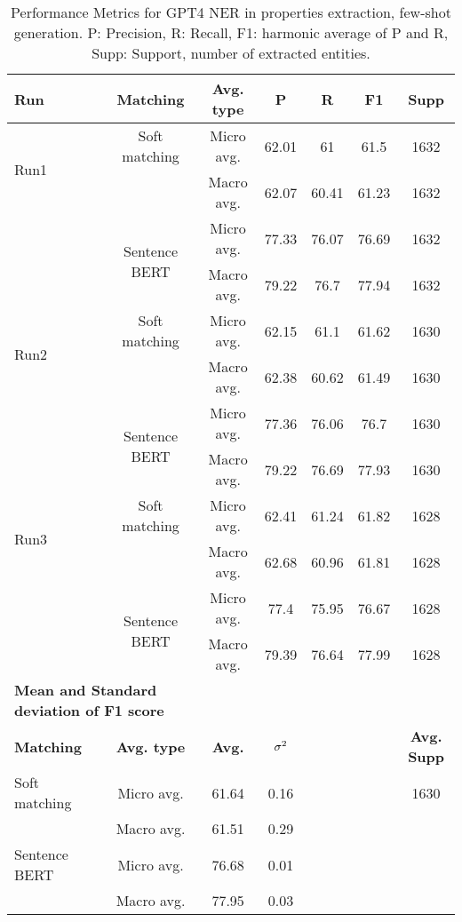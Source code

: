 \begin{table}[htbp]
\small
  \centering
  \caption{Performance Metrics for GPT4 NER in properties extraction, few-shot generation. P: Precision, R: Recall, F1: harmonic average of P and R, Supp: Support, number of extracted entities.}
  \begin{tabular}{lcccccc}
    \toprule
   \textbf{Run} & \textbf{Matching} & \textbf{Avg. type} & \textbf{P} & \textbf{R} & \textbf{F1} & \textbf{Supp} \\
    \midrule
    \multirow{2}{*}{Run1} & Soft matching & Micro avg. & 62.01 & 61 & 61.5 & 1632 \\
    & & Macro avg. & 62.07 & 60.41 & 61.23 & 1632 \\
    \cmidrule{2-7}
    & \multirow{2}{*}{Sentence BERT} & Micro avg. & 77.33 & 76.07 & 76.69 & 1632 \\
    & & Macro avg. & 79.22 & 76.7 & 77.94 & 1632 \\
    \midrule
    \multirow{2}{*}{Run2} & Soft matching & Micro avg. & 62.15 & 61.1 & 61.62 & 1630 \\
    & & Macro avg. & 62.38 & 60.62 & 61.49 & 1630 \\
    \cmidrule{2-7}
    & \multirow{2}{*}{Sentence BERT} & Micro avg. & 77.36 & 76.06 & 76.7 & 1630 \\
    & & Macro avg. & 79.22 & 76.69 & 77.93 & 1630 \\
    \midrule
    \multirow{2}{*}{Run3} & Soft matching & Micro avg. & 62.41 & 61.24 & 61.82 & 1628 \\
    & & Macro avg. & 62.68 & 60.96 & 61.81 & 1628 \\
    \cmidrule{2-7}
    & \multirow{2}{*}{Sentence BERT} & Micro avg. & 77.4 & 75.95 & 76.67 & 1628 \\
    & & Macro avg. & 79.39 & 76.64 & 77.99 & 1628 \\
    \midrule
    \multicolumn{2}{l}{\textbf{Mean and Standard deviation of F1 score}} & & & & & \\
    \midrule
    \textbf{Matching} & \textbf{Avg. type} & \textbf{Avg.} & $\sigma\textsuperscript{2}$ & & & \textbf{Avg. Supp}\\
    Soft matching & Micro avg. & 61.64 & 0.16 & & & 1630 \\
    & Macro avg. & 61.51 & 0.29 & & & \\
    Sentence BERT & Micro avg. & 76.68 & 0.01 & & & \\
    & Macro avg. & 77.95 & 0.03 & & & \\
    \bottomrule
  \end{tabular}
\end{table}

